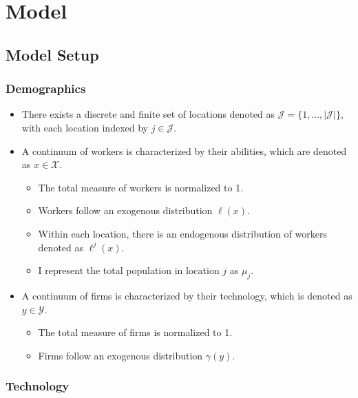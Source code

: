 \documentclass[
  letterpaper,
  DIV=11,
  numbers=noendperiod]{scrreprt}
\providecommand{\tightlist}{%
  \setlength{\itemsep}{0pt}\setlength{\parskip}{0pt}}\usepackage{longtable,booktabs,array}
\begin{document}

\hypertarget{model}{%
\chapter{Model}\label{model}}

\hypertarget{model-setup}{%
\section{Model Setup}\label{model-setup}}

\hypertarget{demographics}{%
\subsection{Demographics}\label{demographics}}

\begin{itemize}
\tightlist
\item
  There exists a discrete and finite set of locations denoted as
  \(\mathcal{J} = \{1, \ldots, |\mathcal{J}|\}\), with each location
  indexed by \(j \in \mathcal{J}\).
\item
  A continuum of workers is characterized by their abilities, which are
  denoted as \(x \in \mathcal{X}\).

  \begin{itemize}
  \tightlist
  \item
    The total measure of workers is normalized to 1.
  \item
    Workers follow an exogenous distribution \(\ell(x)\).
  \item
    Within each location, there is an endogenous distribution of workers
    denoted as \(\ell^{j}(x)\).
  \item
    I represent the total population in location \(j\) as \(\mu_j\).
  \end{itemize}
\item
  A continuum of firms is characterized by their technology, which is
  denoted as \(y \in \mathcal{Y}\).

  \begin{itemize}
  \tightlist
  \item
    The total measure of firms is normalized to 1.
  \item
    Firms follow an exogenous distribution \(\gamma(y)\).
  \end{itemize}
\end{itemize}

\hypertarget{technology}{%
\subsection{Technology}\label{technology}}
\end{document}

